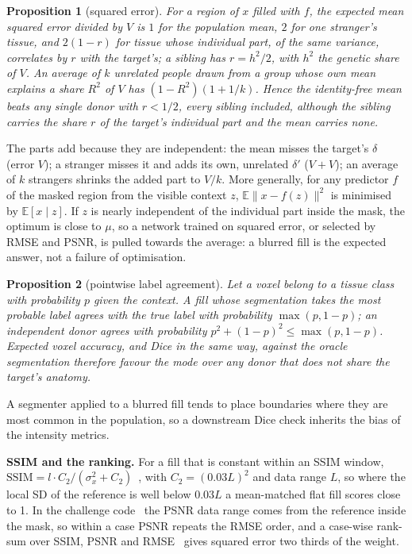 \documentclass{article}
\newtheorem{prop}{Proposition}
\begin{document}
\begin{prop}[squared error]
For a region of $x$ filled with $f$, the expected mean squared error divided by $V$ is $1$ for the population mean, $2$ for one stranger's tissue, and $2(1-r)$ for tissue whose individual part, of the same variance, correlates by $r$ with the target's; a sibling has $r=h^2/2$, with $h^2$ the genetic share of $V$.
An average of $k$ unrelated people drawn from a group whose own mean explains a share $R^2$ of $V$ has $(1-R^2)(1+1/k)$.
Hence the identity-free mean beats any single donor with $r<1/2$, every sibling included, although the sibling carries the share $r$ of the target's individual part and the mean carries none.
\end{prop}
\noindent The parts add because they are independent: the mean misses the target's $\delta$ (error $V$); a stranger misses it and adds its own, unrelated $\delta'$ ($V+V$); an average of $k$ strangers shrinks the added part to $V/k$.
More generally, for any predictor $f$ of the masked region from the visible context $z$, $\mathbb{E}\|x-f(z)\|^2$ is minimised by $\mathbb{E}[x\mid z]$.
If $z$ is nearly independent of the individual part inside the mask, the optimum is close to $\mu$, so a network trained on squared error, or selected by RMSE and PSNR, is pulled towards the average: a blurred fill is the expected answer, not a failure of optimisation.

\begin{prop}[pointwise label agreement]
Let a voxel belong to a tissue class with probability $p$ given the context.
A fill whose segmentation takes the most probable label agrees with the true label with probability $\max(p,1-p)$; an independent donor agrees with probability $p^2+(1-p)^2\le\max(p,1-p)$.
Expected voxel accuracy, and Dice in the same way, against the oracle segmentation therefore favour the mode over any donor that does not share the target's anatomy.
\end{prop}
\noindent A segmenter applied to a blurred fill tends to place boundaries where they are most common in the population, so a downstream Dice check inherits the bias of the intensity metrics.

\textbf{SSIM and the ranking.} For a fill that is constant within an SSIM window, $\mathrm{SSIM}=l\cdot C_2/(\sigma_x^2+C_2)$~\cite{wang2004}, with $C_2=(0.03L)^2$ and data range $L$, so where the local SD of the reference is well below $0.03L$ a mean-matched flat fill scores close to 1.
In the challenge code~\cite{inpainting2026} the PSNR data range comes from the reference inside the mask, so within a case PSNR repeats the RMSE order, and a case-wise rank-sum over SSIM, PSNR and RMSE~\cite{kofler2023brats} gives squared error two thirds of the weight.
\end{document}
